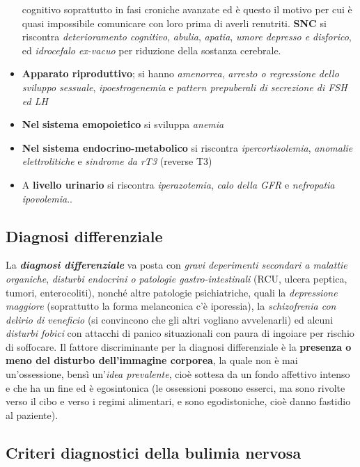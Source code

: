 \begin{itemize}
  cognitivo soprattutto in fasi croniche avanzate ed è questo il motivo
  per cui è quasi impossibile comunicare con loro prima di averli
  renutriti. \textbf{SNC} si riscontra \emph{deterioramento cognitivo},
  \emph{abulia}, \emph{apatia}, \emph{umore depresso e disforico}, ed
  \emph{idrocefalo ex-vacuo} per riduzione della sostanza cerebrale.
\item
  \textbf{Apparato riproduttivo}; si hanno \emph{amenorrea},
  \emph{arresto o regressione dello sviluppo sessuale},
  \emph{ipoestrogenemia} e \emph{pattern prepuberali di secrezione di
  FSH ed LH}
\item
  \textbf{Nel} \textbf{sistema emopoietico} si sviluppa \emph{anemia}
\item
  \textbf{Nel sistema endocrino-metabolico} si riscontra
  \emph{ipercortisolemia}, \emph{anomalie elettrolitiche} e
  \emph{sindrome da rT3} (reverse T3)
\item
  A \textbf{livello urinario} si riscontra \emph{iperazotemia},
  \emph{calo della GFR} e \emph{nefropatia ipovolemia}..
\end{itemize}

\subsection{Diagnosi differenziale}

La \textbf{\emph{diagnosi differenziale}} va posta con \emph{gravi
deperimenti secondari a malattie organiche}, \emph{disturbi endocrini o
patologie gastro-intestinali} (RCU, ulcera peptica, tumori,
enterocoliti), nonché altre patologie psichiatriche, quali la
\emph{depressione maggiore} (soprattutto la forma melanconica c'è
iporessia), la \emph{schizofrenia con delirio di veneficio} (si
convincono che gli altri vogliano avvelenarli) ed alcuni \emph{disturbi
fobici} con attacchi di panico situazionali con paura di ingoiare per
rischio di soffocare. Il fattore discriminante per la diagnosi
differenziale è la \textbf{presenza o meno del disturbo dell'immagine
corporea}, la quale non è mai un'ossessione, bensì un'\emph{idea
prevalente}, cioè sottesa da un fondo affettivo intenso e che ha un fine
ed è egosintonica (le ossessioni possono esserci, ma sono rivolte verso
il cibo e verso i regimi alimentari, e sono egodistoniche, cioè danno
fastidio al paziente).

\subsection{Criteri diagnostici della bulimia nervosa}

